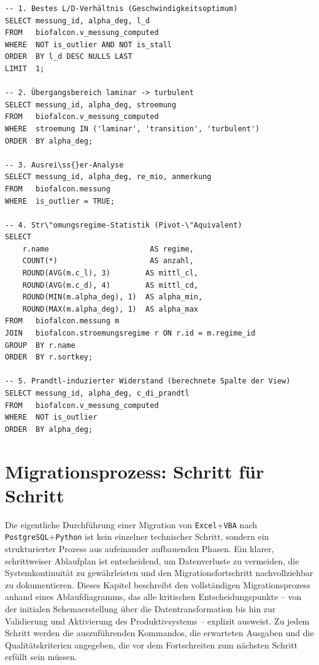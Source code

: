 \documentclass[12pt,a4paper]{report}
\theoremstyle{definition}
\theoremstyle{remark}
\newcommand{\excel}{\texttt{Excel}}
\newcommand{\vba}{\texttt{VBA}}
\newcommand{\pg}{\texttt{PostgreSQL}}
\newcommand{\py}{\texttt{Python}}
\begin{document}
\begin{lstlisting}[style=sql, caption={Analytische Abfragen gegen v\_messung\_computed}]
-- 1. Bestes L/D-Verhältnis (Geschwindigkeitsoptimum)
SELECT messung_id, alpha_deg, l_d
FROM   biofalcon.v_messung_computed
WHERE  NOT is_outlier AND NOT is_stall
ORDER  BY l_d DESC NULLS LAST
LIMIT  1;

-- 2. Übergangsbereich laminar -> turbulent
SELECT messung_id, alpha_deg, stroemung
FROM   biofalcon.v_messung_computed
WHERE  stroemung IN ('laminar', 'transition', 'turbulent')
ORDER  BY alpha_deg;

-- 3. Ausrei\ss{}er-Analyse
SELECT messung_id, alpha_deg, re_mio, anmerkung
FROM   biofalcon.messung
WHERE  is_outlier = TRUE;

-- 4. Str\"omungsregime-Statistik (Pivot-\"Aquivalent)
SELECT
    r.name                       AS regime,
    COUNT(*)                     AS anzahl,
    ROUND(AVG(m.c_l), 3)        AS mittl_cl,
    ROUND(AVG(m.c_d), 4)        AS mittl_cd,
    ROUND(MIN(m.alpha_deg), 1)  AS alpha_min,
    ROUND(MAX(m.alpha_deg), 1)  AS alpha_max
FROM   biofalcon.messung m
JOIN   biofalcon.stroemungsregime r ON r.id = m.regime_id
GROUP  BY r.name
ORDER  BY r.sortkey;

-- 5. Prandtl-induzierter Widerstand (berechnete Spalte der View)
SELECT messung_id, alpha_deg, c_di_prandtl
FROM   biofalcon.v_messung_computed
WHERE  NOT is_outlier
ORDER  BY alpha_deg;
\end{lstlisting}

\chapter{Migrationsprozess: Schritt für Schritt}

Die eigentliche Durchführung einer Migration von \excel{}+\vba{} nach \pg{}+\py{} ist kein einzelner technischer Schritt, sondern ein strukturierter Prozess aus aufeinander aufbauenden Phasen. Ein klarer, schrittweiser Ablaufplan ist entscheidend, um Datenverluste zu vermeiden, die Systemkontinuität zu gewährleisten und den Migrationsfortschritt nachvollziehbar zu dokumentieren. Dieses Kapitel beschreibt den vollständigen Migrationsprozess anhand eines Ablaufdiagramms, das alle kritischen Entscheidungspunkte -- von der initialen Schemaerstellung über die Datentransformation bis hin zur Validierung und Aktivierung des Produktivsystems -- explizit ausweist. Zu jedem Schritt werden die auszuführenden Kommandos, die erwarteten Ausgaben und die Qualitätskriterien angegeben, die vor dem Fortschreiten zum nächsten Schritt erfüllt sein müssen.
\end{document}
